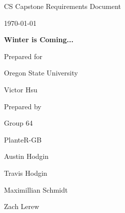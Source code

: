\documentclass[onecolumn, draftclsnofoot,10pt, compsoc]{IEEEtran}
\def \CapstoneTeamName{			              			 PlanteR-GB}
\def \CapstoneTeamNumber{					           			 Group 64}
\def \GroupMemberOne{				           				Austin Hodgin}
\def \GroupMemberTwo{				           				Travis Hodgin}
\def \GroupMemberThree{			            Maximillian Schmidt}
\def\GroupMemberFour{		        	               Zach Lerew}
\def \CapstoneProjectName{	      	    Winter is Coming...}
\def \CapstoneSponsorCompany{		    Oregon State University}
\def \CapstoneSponsorPerson{		 			  				 Victor Hsu}
\def \DocType{		%
				Requirements Document
				}
\newcommand{\NameSigPair}[1]{\par
\makebox[2.75in][r]{#1} \hfil 	\makebox[3.25in]{\makebox[2.25in]{\hrulefill} \hfill		\makebox[.75in]{\hrulefill}}
\par\vspace{-12pt} \textit{\tiny\noindent
\makebox[2.75in]{} \hfil		\makebox[3.25in]{\makebox[2.25in][r]{Signature} \hfill	\makebox[.75in][r]{Date}}}}
\renewcommand{\NameSigPair}[1]{#1}
\begin{document}
\begin{titlepage}
    \begin{singlespace}
        \hfill


        \par\vspace{.2in}
        \centering
        \scshape{
            \huge CS Capstone \DocType \par
            {\large\today}\par
            \vspace{.5in}
            \textbf{\Huge\CapstoneProjectName}\par

						\vspace{1in}

            {\large Prepared for}\par
            \Huge \CapstoneSponsorCompany\par
            \vspace{5pt}
            {\Large\NameSigPair{\CapstoneSponsorPerson}\par}

						\vspace{1in}

            {\large Prepared by}\par
						{\huge \CapstoneTeamNumber}\par
            \CapstoneTeamName\par
            \vspace{5pt}

            {
							\Large
							\NameSigPair{\GroupMemberOne}\par
							\NameSigPair{\GroupMemberTwo}\par
							\NameSigPair{\GroupMemberThree}\par
							\NameSigPair{\GroupMemberFour}\par
            }

            \vspace{20pt}
        }
				\newpage
        \begin{abstract}
				\noindent This project will create a system that controls RGB LEDs responsible for indoor plant growth during the cold seasons.
				Seasonal weather conditions may vary between different parts of the world, but plant growth becomes especially difficult during the fall and winter months.
				Oregon is an exceptional case of this rule. The state's winter season produces a hostile growth environment for plants such as herbs, spices, and decorative flowers.
				Plants like these are not able to survive outside in the cold, dark, and humid Oregon weather.


\end{abstract}
\end{singlespace}
\end{titlepage}
\end{document}
